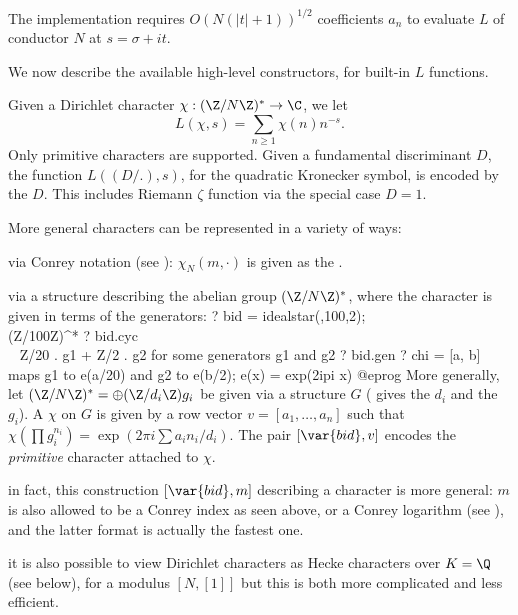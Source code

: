 The implementation requires $O(N(|t|+1))^{1/2}$ coefficients $a_n$
to evaluate $L$ of conductor $N$ at $s = \sigma + i t$.

We now describe the available high-level constructors, for built-in $L$
functions.


Given a Dirichlet character $\chi:(\Z/N\Z)^*\to \C$, we let
$$L(\chi, s) = \sum_{n\geq 1} \chi(n) n^{-s}.$$
Only primitive characters are supported. Given a fundamental discriminant
$D$, the function $L((D/.), s)$, for the quadratic Kronecker symbol, is encoded
by the  $D$. This includes Riemann $\zeta$ function via the special
case $D = 1$.

More general characters can be represented in a variety of ways:

\item via Conrey notation (see ): $\chi_N(m,\cdot)$
is given as the  .

\item via a  structure describing the abelian  group $(\Z/N\Z)^*$,
where the character is given in terms of the  generators:
\bprog
  ? bid = idealstar(,100,2); \\ (Z/100Z)^*
  ? bid.cyc \\ ~ Z/20 . g1  + Z/2 . g2 for some generators g1 and g2
  ? bid.gen
  ? chi = [a, b]  \\ maps g1 to e(a/20) and g2 to e(b/2);  e(x) = exp(2ipi x)
@eprog\noindent
More generally, let $(\Z/N\Z)^* = \oplus (\Z/d_i\Z) g_i$ be given via a
 structure $G$ ( gives the $d_i$ and  the
$g_i$). A  $\chi$ on $G$ is given by a row vector
$v = [a_1,\ldots,a_n]$ such that $\chi(\prod g_i^{n_i}) = \exp(2\pi i\sum a_i
n_i / d_i)$. The pair $[\var{bid}, v]$ encodes the \emph{primitive} character
attached to $\chi$.

\item in fact, this construction $[\var{bid}, m]$ describing a character
is more general: $m$ is also allowed to be a Conrey index as seen above,
or a Conrey logarithm (see ), and the latter format is
actually the fastest one.

\item it is also possible to view Dirichlet characters as Hecke characters
over $K = \Q$ (see below), for a modulus $[N, [1]]$ but this is both more
complicated and less efficient.

